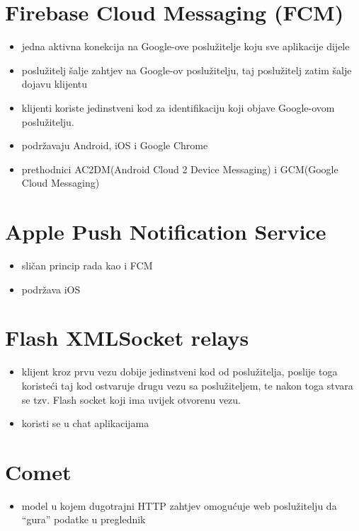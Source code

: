 \documentclass[times, utf8, zavrsni]{fer}
\begin{document}
\section{Firebase Cloud Messaging (FCM)}
\begin{itemize}
    \item jedna aktivna konekcija na Google-ove poslužitelje koju sve aplikacije dijele
    \item poslužitelj šalje zahtjev na Google-ov poslužitelju, taj poslužitelj zatim šalje dojavu klijentu
    \item klijenti koriste jedinstveni kod za identifikaciju koji objave Google-ovom poslužitelju.
    \item podržavaju Android, iOS i Google Chrome
    \item prethodnici AC2DM(Android Cloud 2 Device Messaging) i GCM(Google Cloud Messaging)
\end{itemize}

\section{Apple Push Notification Service}
\begin{itemize}
    \item sličan princip rada kao i FCM
    \item podržava iOS
\end{itemize}

\section{Flash XMLSocket relays}
\begin{itemize}
    \item klijent kroz prvu vezu dobije jedinstveni kod od poslužitelja, poslije toga koristeći taj kod ostvaruje drugu vezu sa poslužiteljem, te nakon toga stvara se tzv. Flash socket koji ima uvijek otvorenu vezu.
    \item koristi se u chat aplikacijama
\end{itemize}

\section{Comet}
\begin{itemize}
    \item model u kojem dugotrajni HTTP zahtjev omogućuje web poslužitelju da ``gura'' podatke u preglednik
\end{itemize}
\end{document}
